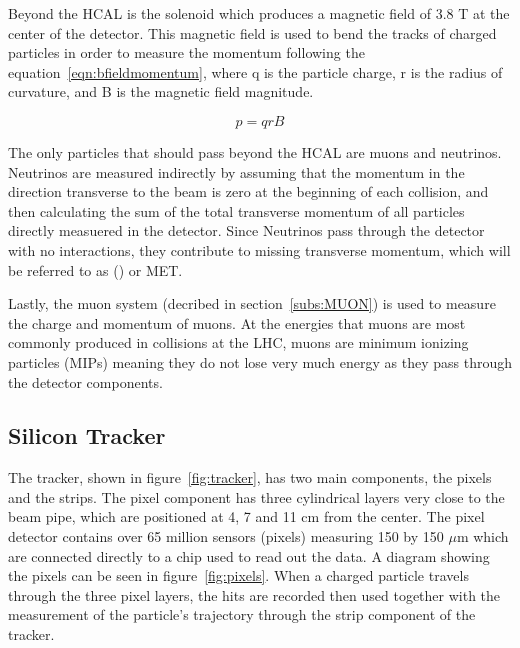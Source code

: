 Beyond the HCAL is the solenoid which produces a magnetic field of 3.8 T at the center of the detector.
This magnetic field is used to bend the tracks of charged particles in order to measure the momentum following the equation~\ref{eqn:bfieldmomentum},
where q is the particle charge, r is the radius of curvature, and B is the magnetic field magnitude.

\begin{equation}
  \label{eqn:bfieldmomentum}
p = qrB
\end{equation}

The only particles that should pass beyond the HCAL are muons and neutrinos.
Neutrinos are measured indirectly by assuming that the momentum in the direction transverse to the beam is zero at the beginning of each collision,
and then calculating the sum of the total transverse momentum of all particles directly measuered in the detector.
Since Neutrinos pass through the detector with no interactions, they contribute to missing transverse momentum, which will be referred to as (\MET) or MET.

Lastly, the muon system (decribed in section~\ref{subs:MUON}) is used to measure the charge and momentum of muons.
At the energies that muons are most commonly produced in collisions at the LHC, muons are minimum ionizing particles (MIPs)
meaning they do not lose very much energy as they pass through the detector components.


\subsection{Silicon Tracker}
\label {subs:tracker}
The tracker, shown in figure~\ref{fig:tracker}, has two main components, the pixels and the strips.
The pixel component has three cylindrical layers very close to the beam pipe, which are positioned at 4, 7 and 11 cm from the center.
The pixel detector contains over 65 million sensors (pixels) measuring 150 by 150 $\mu$m which are connected directly to a chip used to read out the data.
A diagram showing the pixels can be seen in figure~\ref{fig:pixels}.
When a charged particle travels through the three pixel layers,
the hits are recorded then used together with the measurement of the particle's trajectory through the strip component of the tracker.

